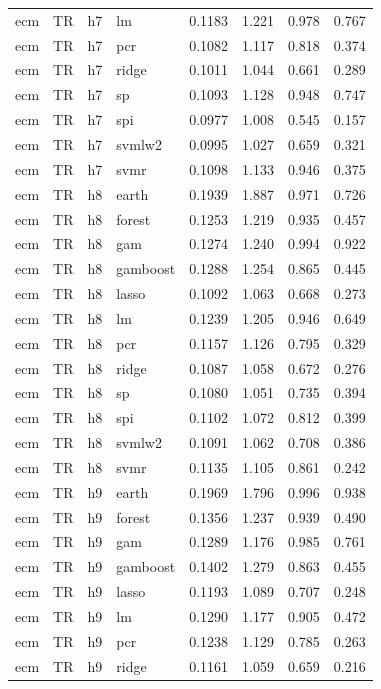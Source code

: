 \begin{ThreePartTable}
\begin{longtable}[t]{llclcccc}
ecm & TR & h7 & lm & 0.1183 & 1.221 & 0.978 & 0.767\\
ecm & TR & h7 & pcr & 0.1082 & 1.117 & 0.818 & 0.374\\
ecm & TR & h7 & ridge & 0.1011 & 1.044 & 0.661 & 0.289\\
ecm & TR & h7 & sp & 0.1093 & 1.128 & 0.948 & 0.747\\
ecm & TR & h7 & spi & 0.0977 & 1.008 & 0.545 & 0.157\\
ecm & TR & h7 & svmlw2 & 0.0995 & 1.027 & 0.659 & 0.321\\
ecm & TR & h7 & svmr & 0.1098 & 1.133 & 0.946 & 0.375\\
\addlinespace
ecm & TR & h8 & earth & 0.1939 & 1.887 & 0.971 & 0.726\\
ecm & TR & h8 & forest & 0.1253 & 1.219 & 0.935 & 0.457\\
ecm & TR & h8 & gam & 0.1274 & 1.240 & 0.994 & 0.922\\
ecm & TR & h8 & gamboost & 0.1288 & 1.254 & 0.865 & 0.445\\
ecm & TR & h8 & lasso & 0.1092 & 1.063 & 0.668 & 0.273\\
ecm & TR & h8 & lm & 0.1239 & 1.205 & 0.946 & 0.649\\
ecm & TR & h8 & pcr & 0.1157 & 1.126 & 0.795 & 0.329\\
ecm & TR & h8 & ridge & 0.1087 & 1.058 & 0.672 & 0.276\\
ecm & TR & h8 & sp & 0.1080 & 1.051 & 0.735 & 0.394\\
ecm & TR & h8 & spi & 0.1102 & 1.072 & 0.812 & 0.399\\
ecm & TR & h8 & svmlw2 & 0.1091 & 1.062 & 0.708 & 0.386\\
ecm & TR & h8 & svmr & 0.1135 & 1.105 & 0.861 & 0.242\\
\addlinespace
ecm & TR & h9 & earth & 0.1969 & 1.796 & 0.996 & 0.938\\
ecm & TR & h9 & forest & 0.1356 & 1.237 & 0.939 & 0.490\\
ecm & TR & h9 & gam & 0.1289 & 1.176 & 0.985 & 0.761\\
ecm & TR & h9 & gamboost & 0.1402 & 1.279 & 0.863 & 0.455\\
ecm & TR & h9 & lasso & 0.1193 & 1.089 & 0.707 & 0.248\\
ecm & TR & h9 & lm & 0.1290 & 1.177 & 0.905 & 0.472\\
ecm & TR & h9 & pcr & 0.1238 & 1.129 & 0.785 & 0.263\\
ecm & TR & h9 & ridge & 0.1161 & 1.059 & 0.659 & 0.216\\

\end{longtable}
\end{ThreePartTable}
